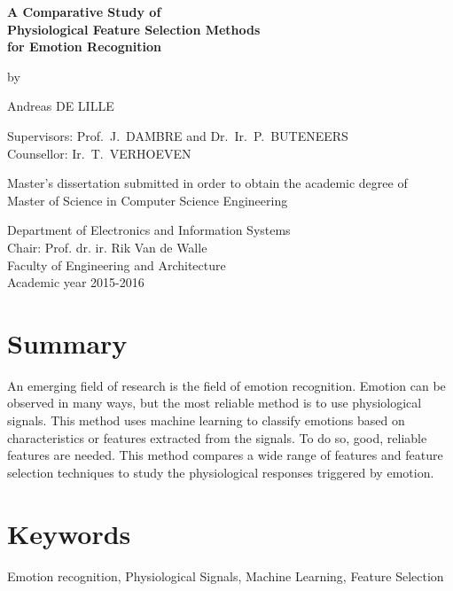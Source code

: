 
\newpage
{}
{
\setlength{\baselineskip}{14pt}
\setlength{\parindent}{0pt}
\setlength{\parskip}{8pt}

\begin{center}

\textbf{\huge
A Comparative Study of \\
Physiological Feature Selection Methods \\
for Emotion Recognition\\
}

by

Andreas DE LILLE

\end{center}

Supervisors: Prof.~J.~DAMBRE and Dr.~Ir.~P.~BUTENEERS \\
Counsellor: Ir.~T.~VERHOEVEN

Master's dissertation submitted in order to obtain the academic degree of\\
Master of Science in Computer Science Engineering

Department of Electronics and Information Systems\\
Chair: Prof. dr. ir. Rik Van de Walle\\
Faculty of Engineering and Architecture\\
Academic year 2015-2016\\



\section*{Summary}

An emerging field of research is the field of emotion recognition. Emotion can be observed in many ways, but the most reliable method is to use physiological signals.  This method uses machine learning to classify emotions based on characteristics or features extracted from the signals. To do so, good, reliable features are needed. This method compares a wide range of features and feature selection techniques to study the physiological responses triggered by emotion.

\section*{Keywords}

Emotion recognition, Physiological Signals, Machine Learning, Feature Selection

}

\newpage %
